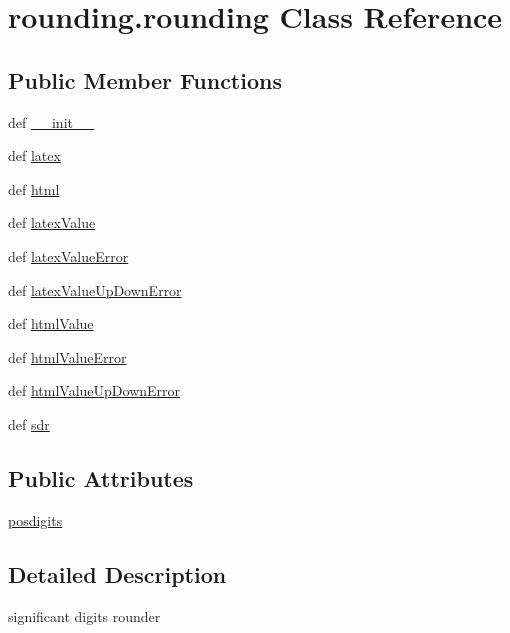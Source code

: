 \section{rounding.\-rounding Class Reference}
\label{classrounding_1_1rounding}
\subsection*{Public Member Functions}
\begin{DoxyCompactItemize}
\item 
def \hyperlink{classrounding_1_1rounding_a0463d493f9a14d9b55e9a564951dc2d4}{\-\_\-\-\_\-init\-\_\-\-\_\-}
\item 
def \hyperlink{classrounding_1_1rounding_ad6343c0da78804fafd6f975a6f40df0b}{latex}
\item 
def \hyperlink{classrounding_1_1rounding_ad12a6fc41961c6f7d7f18a2730de2662}{html}
\item 
def \hyperlink{classrounding_1_1rounding_abbd9b603aad9cc12cb0ec24bd33d95f8}{latex\-Value}
\item 
def \hyperlink{classrounding_1_1rounding_a2a5a6c6e33f90e2964d6784887b58630}{latex\-Value\-Error}
\item 
def \hyperlink{classrounding_1_1rounding_a1b16588ad7506513ecad4c0febddb57f}{latex\-Value\-Up\-Down\-Error}
\item 
def \hyperlink{classrounding_1_1rounding_ace06de73693ab56cc8dd5966c4881030}{html\-Value}
\item 
def \hyperlink{classrounding_1_1rounding_aac2b95951f090122b0fcaba6840615b1}{html\-Value\-Error}
\item 
def \hyperlink{classrounding_1_1rounding_ac05e4b7e8985308d93e8a42c8bf54bcb}{html\-Value\-Up\-Down\-Error}
\item 
def \hyperlink{classrounding_1_1rounding_aa5e7a5d5f745e4de3f36eb02cb1ccb42}{sdr}
\end{DoxyCompactItemize}
\subsection*{Public Attributes}
\begin{DoxyCompactItemize}
\item 
\hyperlink{classrounding_1_1rounding_a36f4099d60c7a6ed915770aac999c3c3}{posdigits}
\end{DoxyCompactItemize}


\subsection{Detailed Description}
\begin{DoxyVerb}significant digits rounder
\end{DoxyVerb}
 

